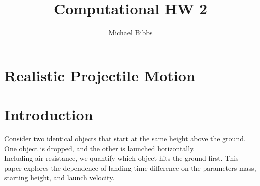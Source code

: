 \documentclass{article}
\title{Computational HW 2}
\author{Michael Bibbs}
\begin{document}
	\maketitle
	\section*{Realistic Projectile Motion}
	\section{Introduction}
	Consider two identical objects that start at the same height above the ground. One object is dropped, and the other is launched horizontally. 
	\\ \indent Including air resistance, we quantify which object hits the ground first. This paper explores the dependence of landing time difference on the parameters mass, starting height, and launch velocity.
\end{document}
